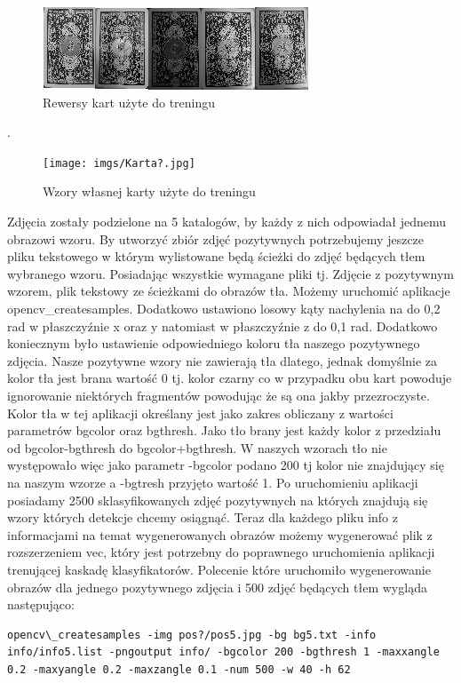 \begin{figure}[H]
\centering
\includegraphics[scale=1.0]{imgs/RewersyKarty.jpg}
\caption{Rewersy kart użyte do treningu}
\label{fig:KartaRewers}
\end{figure}
.

\begin{figure}[H]
\centering
\texttt{[image: imgs/Karta?.jpg]}
\caption{Wzory własnej karty użyte do treningu}
\label{fig:KartaTajemnicza}
\end{figure}

Zdjęcia zostały podzielone na 5 katalogów, by każdy z nich odpowiadał jednemu obrazowi wzoru. By utworzyć zbiór zdjęć pozytywnych potrzebujemy jeszcze pliku tekstowego w którym wylistowane będą ścieżki do zdjęć będących tłem wybranego wzoru. Posiadając wszystkie wymagane pliki tj. Zdjęcie z pozytywnym wzorem, plik tekstowy ze ścieżkami do obrazów tła. Możemy uruchomić aplikacje opencv\_createsamples. Dodatkowo ustawiono losowy kąty nachylenia na do 0,2 rad w płaszczyźnie x oraz y natomiast w płaszczyźnie z do 0,1 rad. Dodatkowo koniecznym było ustawienie odpowiedniego koloru tła naszego pozytywnego zdjęcia. Nasze pozytywne wzory nie zawierają tła dlatego, jednak domyślnie za kolor tła jest brana wartość 0 tj. kolor czarny co w przypadku obu kart powoduje ignorowanie niektórych fragmentów powodując że są ona jakby przezroczyste. Kolor tła w tej aplikacji określany jest jako zakres obliczany z wartości parametrów bgcolor oraz bgthresh. Jako tło brany jest każdy kolor z przedziału od bgcolor-bgthresh do bgcolor+bgthresh. W naszych wzorach tło nie występowało więc jako parametr -bgcolor podano 200 tj kolor nie znajdujący się na naszym wzorze a -bgtresh przyjęto wartość 1. Po uruchomieniu aplikacji posiadamy 2500 sklasyfikowanych zdjęć pozytywnych na których znajdują się wzory których detekcje chcemy osiągnąć. Teraz dla każdego pliku info z informacjami na temat wygenerowanych obrazów możemy wygenerować plik z rozszerzeniem vec, który jest potrzebny do poprawnego uruchomienia aplikacji trenującej kaskadę klasyfikatorów.
Polecenie które uruchomiło wygenerowanie obrazów dla jednego pozytywnego zdjęcia i 500 zdjęć będących tłem wygląda następująco:
\begin{lstlisting}
opencv\_createsamples -img pos?/pos5.jpg -bg bg5.txt -info info/info5.list -pngoutput info/ -bgcolor 200 -bgthresh 1 -maxxangle 0.2 -maxyangle 0.2 -maxzangle 0.1 -num 500 -w 40 -h 62
\end{lstlisting}


